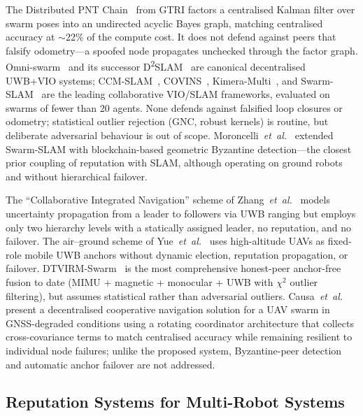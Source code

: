 \documentclass[journal,10pt,twocolumn]{IEEEtran}
\begin{document}
The Distributed PNT Chain~\cite{shapero2023distributed} from GTRI factors a centralised Kalman filter over swarm poses into an undirected acyclic Bayes graph, matching centralised accuracy at $\sim$22\% of the compute cost. It does not defend against peers that falsify odometry---a spoofed node propagates unchecked through the factor graph. Omni-swarm~\cite{xu2022omniswarm} and its successor D\textsuperscript{2}SLAM~\cite{xu2022d2slam} are canonical decentralised UWB+VIO systems; CCM-SLAM~\cite{schmuck2019ccmslam}, COVINS~\cite{schmuck2023covinsg}, Kimera-Multi~\cite{tian2022kimera}, and Swarm-SLAM~\cite{lajoie2024swarmslam} are the leading collaborative VIO/SLAM frameworks, evaluated on swarms of fewer than 20 agents. None defends against falsified loop closures or odometry; statistical outlier rejection (GNC, robust kernels) is routine, but deliberate adversarial behaviour is out of scope. Moroncelli~\emph{et~al.}~\cite{moroncelli2024byzantine} extended Swarm-SLAM with blockchain-based geometric Byzantine detection---the closest prior coupling of reputation with SLAM, although operating on ground robots and without hierarchical failover.

The ``Collaborative Integrated Navigation'' scheme of Zhang~\emph{et~al.}~\cite{zhang2025collaborative} models uncertainty propagation from a leader to followers via UWB ranging but employs only two hierarchy levels with a statically assigned leader, no reputation, and no failover. The air--ground scheme of Yue~\emph{et~al.}~\cite{yue2025airground} uses high-altitude UAVs as fixed-role mobile UWB anchors without dynamic election, reputation propagation, or failover. DTVIRM-Swarm~\cite{dtvirm2026} is the most comprehensive honest-peer anchor-free fusion to date (MIMU + magnetic + monocular + UWB with $\chi^2$ outlier filtering), but assumes statistical rather than adversarial outliers. Causa~\emph{et~al.}~\cite{causa2024decentralized} present a decentralised cooperative navigation solution for a UAV swarm in GNSS-degraded conditions using a rotating coordinator architecture that collects cross-covariance terms to match centralised accuracy while remaining resilient to individual node failures; unlike the proposed system, Byzantine-peer detection and automatic anchor failover are not addressed.

\subsection{Reputation Systems for Multi-Robot Systems}
\end{document}
